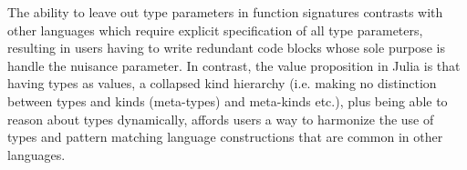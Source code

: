 The ability to leave out type parameters in function signatures contrasts with
other languages which require explicit specification of all type parameters,
resulting in users having to write redundant code blocks whose sole purpose is
handle the nuisance parameter. In contrast, the value proposition in Julia is
that having types as values, a collapsed kind hierarchy (i.e. making no
distinction between types and kinds (meta-types) and meta-kinds etc.), plus
being able to reason about types dynamically, affords users a way to harmonize
the use of types and pattern matching language constructions that are common in
other languages.

